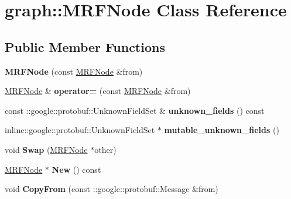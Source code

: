 \hypertarget{classgraph_1_1MRFNode}{
\section{graph::MRFNode Class Reference}
\label{classgraph_1_1MRFNode}
}
\subsection*{Public Member Functions}
\begin{DoxyCompactItemize}
\item 
\hypertarget{classgraph_1_1MRFNode_a021b05b80147363c7e6712f48d44a0a3}{
{\bfseries MRFNode} (const \hyperlink{classgraph_1_1MRFNode}{MRFNode} \&from)}
\label{classgraph_1_1MRFNode_a021b05b80147363c7e6712f48d44a0a3}

\item 
\hypertarget{classgraph_1_1MRFNode_a24e99e7e39879fdb7e5ba3457e05f711}{
\hyperlink{classgraph_1_1MRFNode}{MRFNode} \& {\bfseries operator=} (const \hyperlink{classgraph_1_1MRFNode}{MRFNode} \&from)}
\label{classgraph_1_1MRFNode_a24e99e7e39879fdb7e5ba3457e05f711}

\item 
\hypertarget{classgraph_1_1MRFNode_a8716f067ae2c0b732dbe8e808e58c57f}{
const ::google::protobuf::UnknownFieldSet \& {\bfseries unknown\_\-fields} () const }
\label{classgraph_1_1MRFNode_a8716f067ae2c0b732dbe8e808e58c57f}

\item 
\hypertarget{classgraph_1_1MRFNode_abdd95998aa20cc6e28e69768da470c16}{
inline::google::protobuf::UnknownFieldSet $\ast$ {\bfseries mutable\_\-unknown\_\-fields} ()}
\label{classgraph_1_1MRFNode_abdd95998aa20cc6e28e69768da470c16}

\item 
\hypertarget{classgraph_1_1MRFNode_a6dbf7084428bf6caece3fb82097f1944}{
void {\bfseries Swap} (\hyperlink{classgraph_1_1MRFNode}{MRFNode} $\ast$other)}
\label{classgraph_1_1MRFNode_a6dbf7084428bf6caece3fb82097f1944}

\item 
\hypertarget{classgraph_1_1MRFNode_aae86515fdbc1b37e4e0199213ca28d73}{
\hyperlink{classgraph_1_1MRFNode}{MRFNode} $\ast$ {\bfseries New} () const }
\label{classgraph_1_1MRFNode_aae86515fdbc1b37e4e0199213ca28d73}

\item 
\hypertarget{classgraph_1_1MRFNode_a9597eb49cdf67bc0fcbdf2fd80df98ee}{
void {\bfseries CopyFrom} (const ::google::protobuf::Message \&from)}
\label{classgraph_1_1MRFNode_a9597eb49cdf67bc0fcbdf2fd80df98ee}


\end{DoxyCompactItemize}
